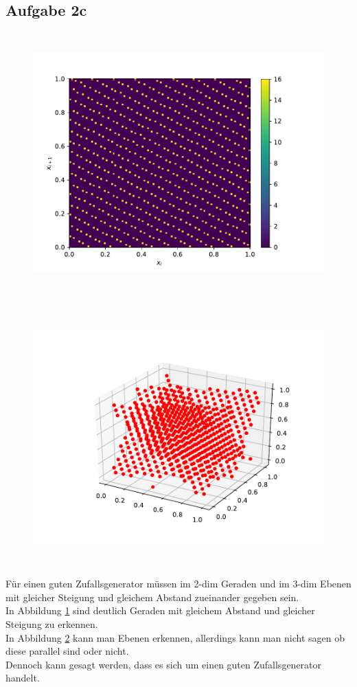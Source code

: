 \subsection*{Aufgabe 2c}
\begin{figure}
  \includegraphics[height=10cm]{Python/Aufgabe2c1.pdf}
  \label{fig:2c1}
\end{figure}
\begin{figure}
  \includegraphics[height=10cm]{Python/Aufgabe2c2.pdf}
  \label{fig:2c2}
\end{figure}

Für einen guten Zufallsgenerator müssen im 2-dim Geraden und im 3-dim Ebenen mit gleicher Steigung und gleichem Abstand zueinander gegeben sein. \\
In Abbildung \ref{fig:2c1} sind deutlich Geraden mit gleichem Abstand und gleicher Steigung zu erkennen. \\ In Abbildung \ref{fig:2c2} kann man Ebenen erkennen, allerdings kann man nicht sagen ob diese parallel sind oder nicht. \\
Dennoch kann gesagt werden, dass es sich um einen guten Zufallsgenerator handelt.

